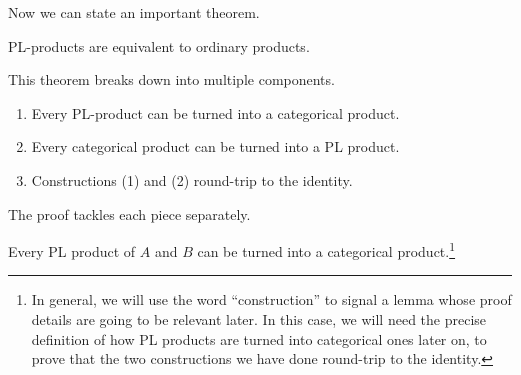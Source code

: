 Now we can state an important theorem.
\begin{theorem}
  PL-products are equivalent to ordinary products.
\end{theorem}
This theorem breaks down into multiple components.
\begin{enumerate}
\item Every PL-product can be turned into a categorical product.
\item Every categorical product can be turned into a PL product.
\item Constructions (1) and (2) round-trip to the identity.
\end{enumerate}
The proof tackles each piece separately.
\begin{construction} \label{cons:pl-prod-to-prod}
Every PL product of $A$ and $B$
can be turned into a categorical product.\footnote{In general, we will use the word ``construction'' to signal a lemma whose proof details are going to be relevant later. In this case, we will need the precise definition of how PL products are turned into categorical ones later on, to prove that the two constructions we have done round-trip to the identity.}
\end{construction}
